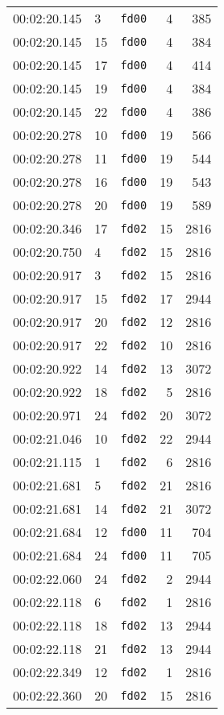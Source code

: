 \documentclass{article}
\begin{document}
\begin{longtable}{lllrr}
00:02:20.145 & 3 & \texttt{fd00} & 4 & 385 \\
00:02:20.145 & 15 & \texttt{fd00} & 4 & 384 \\
00:02:20.145 & 17 & \texttt{fd00} & 4 & 414 \\
00:02:20.145 & 19 & \texttt{fd00} & 4 & 384 \\
00:02:20.145 & 22 & \texttt{fd00} & 4 & 386 \\
00:02:20.278 & 10 & \texttt{fd00} & 19 & 566 \\
00:02:20.278 & 11 & \texttt{fd00} & 19 & 544 \\
00:02:20.278 & 16 & \texttt{fd00} & 19 & 543 \\
00:02:20.278 & 20 & \texttt{fd00} & 19 & 589 \\
00:02:20.346 & 17 & \texttt{fd02} & 15 & 2816 \\
00:02:20.750 & 4 & \texttt{fd02} & 15 & 2816 \\
00:02:20.917 & 3 & \texttt{fd02} & 15 & 2816 \\
00:02:20.917 & 15 & \texttt{fd02} & 17 & 2944 \\
00:02:20.917 & 20 & \texttt{fd02} & 12 & 2816 \\
00:02:20.917 & 22 & \texttt{fd02} & 10 & 2816 \\
00:02:20.922 & 14 & \texttt{fd02} & 13 & 3072 \\
00:02:20.922 & 18 & \texttt{fd02} & 5 & 2816 \\
00:02:20.971 & 24 & \texttt{fd02} & 20 & 3072 \\
00:02:21.046 & 10 & \texttt{fd02} & 22 & 2944 \\
00:02:21.115 & 1 & \texttt{fd02} & 6 & 2816 \\
00:02:21.681 & 5 & \texttt{fd02} & 21 & 2816 \\
00:02:21.681 & 14 & \texttt{fd02} & 21 & 3072 \\
00:02:21.684 & 12 & \texttt{fd00} & 11 & 704 \\
00:02:21.684 & 24 & \texttt{fd00} & 11 & 705 \\
00:02:22.060 & 24 & \texttt{fd02} & 2 & 2944 \\
00:02:22.118 & 6 & \texttt{fd02} & 1 & 2816 \\
00:02:22.118 & 18 & \texttt{fd02} & 13 & 2944 \\
00:02:22.118 & 21 & \texttt{fd02} & 13 & 2944 \\
00:02:22.349 & 12 & \texttt{fd02} & 1 & 2816 \\
00:02:22.360 & 20 & \texttt{fd02} & 15 & 2816 \\

\end{longtable}
\end{document}
